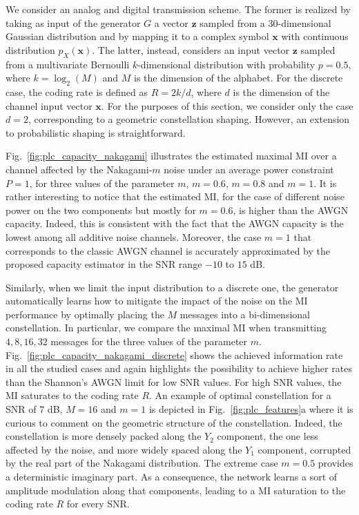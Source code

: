 We consider an analog and digital transmission scheme. The former is realized by taking as input of the generator $G$ a vector $\mathbf{z}$ sampled from a $30$-dimensional Gaussian distribution and by mapping it to a complex symbol $\mathbf{x}$ with continuous distribution $p_{X}(\mathbf{x})$. The latter, instead, considers an input vector $\mathbf{z}$ sampled from a multivariate Bernoulli $k$-dimensional distribution with probability $p=0.5$, where $k=\log_2(M)$ and $M$ is the dimension of the alphabet. For the discrete case, the coding rate is defined as $R = 2k / d$, where $d$ is the dimension of the channel input vector $\mathbf{x}$. For the purposes of this section, we consider only the case $d=2$, corresponding to a geometric constellation shaping. However, an extension to probabilistic shaping is straightforward.

Fig.~\ref{fig:plc_capacity_nakagami} illustrates the estimated maximal MI over a channel affected by the Nakagami-$m$ noise under an average power constraint $P=1$, for three values of the parameter $m$, $m=0.6$, $m=0.8$ and $m=1$. It is rather interesting to notice that the estimated MI, for the case of different noise power on the two components but mostly for $m=0.6$, is higher than the AWGN capacity. Indeed, this is consistent with the fact that the AWGN capacity is the lowest among all additive noise channels. Moreover, the case $m=1$ that corresponds to the classic AWGN channel is accurately approximated by the proposed capacity estimator in the SNR range $-10$ to $15$ dB.

Similarly, when we limit the input distribution to a discrete one, the generator automatically learns how to mitigate the impact of the noise on the MI performance by optimally placing the $M$ messages into a bi-dimensional constellation. In particular, we compare the maximal MI when transmitting $4,8,16,32$ messages for the three values of the parameter $m$. Fig.~\ref{fig:plc_capacity_nakagami_discrete} shows the achieved information rate in all the studied cases and again highlights the possibility to achieve higher rates than the Shannon's AWGN limit for low SNR values. For high SNR values, the MI saturates to the coding rate $R$. An example of optimal constellation for a SNR of $7$ dB, $M=16$ and $m=1$ is depicted in Fig.~\ref{fig:plc_features}a where it is curious to comment on the geometric structure of the constellation. Indeed, the constellation is more densely packed along the $Y_2$ component, the one less affected by the noise, and more widely spaced along the $Y_1$ component, corrupted by the real part of the Nakagami distribution. The extreme case $m=0.5$ provides a deterministic imaginary part. As a consequence, the network learns a sort of amplitude modulation along that components, leading to a MI saturation to the coding rate $R$ for every SNR. 

